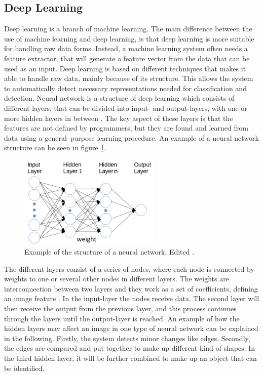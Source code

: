 \subsection{Deep Learning}
Deep learning is a branch of machine learning. The main difference between the use of machine learning and deep learning, is that deep learning is more suitable for handling raw data forms. Instead, a machine learning system often needs a feature extractor, that will generate a feature vector from the data that can be used as an input.
Deep learning is based on different techniques that makes it able to handle raw data, mainly because of its structure.\citep{LeCun2015, Schmidhuber2015} This allows the system to automatically detect necessary representations needed for classification and detection. \newline
Neural network is a structure of deep learning which consists of different layers, that can be divided into input- and output-layers, with one or more hidden layers in between \citep{Schmidhuber2015}. The key aspect of these layers is that the features are not defined by programmers, but they are found and learned from data using a general–purpose learning procedure.\citep{LeCun2015} An example of a neural network structure can be seen in figure \ref{fig:NN_structure}.   

\begin{figure} [H]
\centering
\includegraphics[width=0.6\textwidth]{figures/NN_structure}
\caption{Example of the structure of a neural network. Edited \citep{Acquarelli2017}.}
\label{fig:NN_structure}  
\end{figure}

\noindent
The different layers consist of a series of nodes, where each node is connected by weights to one or several other nodes in different layers. The weights  are interconnection between two layers and they work as a set of coefficients, defining an image feature \citep{Hameed2016}. In the input-layer the nodes receive data. The second layer will then receive the output from the previous layer, and this process continues through the layers until the output-layer is reached.\citep{Schmidhuber2015} An example of how the hidden layers may affect an image in one type of neural network can be explained in the following.  
Firstly, the system detects minor changes like edges. Secondly, the edges are compared and put together to make up different kind of shapes. In the third hidden layer, it will be further combined to make up an object that can be identified.\citep{LeCun2015}

